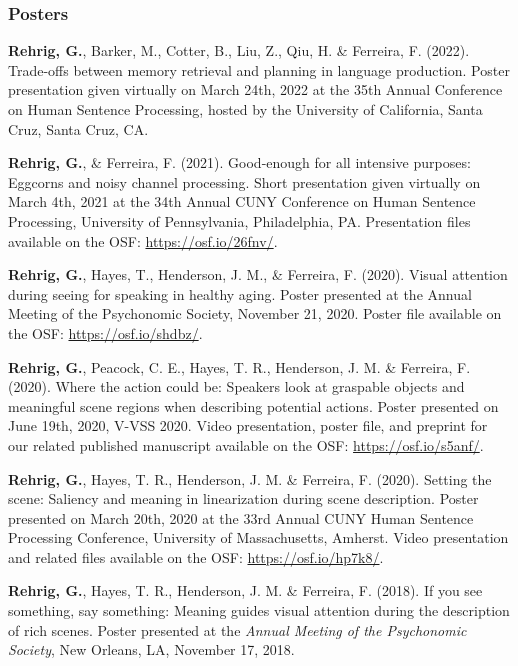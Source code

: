 \subsubsection*{Posters}

\textbf{Rehrig, G.}, Barker, M., Cotter, B., Liu, Z., Qiu, H. \& Ferreira, F. (2022). Trade-offs between memory retrieval and planning in language production. Poster presentation given virtually on March 24th, 2022 at the 35th Annual Conference on Human Sentence Processing, hosted by the University of California, Santa Cruz, Santa Cruz, CA.

\textbf{Rehrig, G.}, \& Ferreira, F. (2021). Good-enough for all intensive purposes: Eggcorns and noisy channel processing. Short presentation given virtually on March 4th, 2021 at the 34th Annual CUNY Conference on Human Sentence Processing, University of Pennsylvania, Philadelphia, PA. Presentation files available on the OSF: \url{https://osf.io/26fnv/}. 

\textbf{Rehrig, G.}, Hayes, T., Henderson, J. M., \& Ferreira, F. (2020). Visual attention during seeing for speaking in healthy aging. Poster presented at the Annual Meeting of the Psychonomic Society, November 21, 2020. Poster file available on the OSF: \url{https://osf.io/shdbz/}. 

\textbf{Rehrig, G.}, Peacock, C. E., Hayes, T. R., Henderson, J. M. \& Ferreira, F. (2020). Where the action could be: Speakers look at graspable objects and meaningful scene regions when describing potential actions. Poster presented on June 19th, 2020, V-VSS 2020. Video presentation, poster file, and preprint for our related published manuscript available on the OSF: \url{https://osf.io/s5anf/}.

\textbf{Rehrig, G.}, Hayes, T. R., Henderson, J. M. \& Ferreira, F. (2020). Setting the scene: Saliency and meaning in linearization during scene description. Poster presented on March 20th, 2020 at the 33rd Annual CUNY Human Sentence Processing Conference, University of Massachusetts, Amherst. Video presentation and related files available on the OSF: \url{https://osf.io/hp7k8/}.

\textbf{Rehrig, G.}, Hayes, T. R., Henderson, J. M. \& Ferreira, F. (2018). If you see something, say something: Meaning guides visual attention during the description of rich scenes. Poster presented at the \textit{Annual Meeting of the Psychonomic Society}, New Orleans, LA, November 17, 2018.


